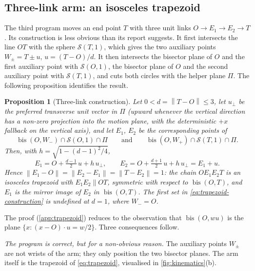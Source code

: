 \documentclass[11pt,a4paper]{article}
\theoremstyle{plain}
\newtheorem{proposition}{Proposition}
\theoremstyle{definition}
\theoremstyle{remark}
\newcommand{\norm}[1]{\left\lVert#1\right\rVert}
\newcommand{\bis}{\operatorname{bis}}
\newcommand{\Sph}{\mathcal{S}}
\begin{document}
\subsection{Three-link arm: an isosceles trapezoid}\label{sec:threelink}

The third program moves an end point $T$ with three unit links $O\to E_1\to
E_2\to T$. Its construction is less obvious than its report suggests. It first
intersects the line $OT$ with the sphere $\Sph(T,1)$, which gives the two
auxiliary points $W_\pm=T\pm u$, $u=(T-O)/d$. It then intersects the bisector
plane of $O$ and the first auxiliary point with $\Sph(O,1)$, the bisector plane
of $O$ and the second auxiliary point with $\Sph(T,1)$, and cuts both circles
with the helper plane $\Pi$. The following proposition identifies the result.

\begin{proposition}[Three-link construction]\label{prop:trapezoid}
Let $0<d=\norm{T-O}\le 3$, let $u_\perp$ be the preferred transverse unit
vector in $\Pi$ (upward whenever the vertical direction has a non-zero
projection into the motion plane, with the deterministic $+x$ fallback on the
vertical axis), and let $E_1$, $E_2$ be the corresponding points of
\begin{equation}
  \bis(O,W_-)\cap\Sph(O,1)\cap\Pi
  \qquad\text{and}\qquad
  \bis(O,W_+)\cap\Sph(T,1)\cap\Pi .
  \label{eq:trapezoid-construction}
\end{equation}
Then, with $h=\sqrt{1-(d-1)^2/4}$,
\begin{equation}
  E_1=O+\tfrac{d-1}{2}\,u+h\,u_\perp,
  \qquad
  E_2=O+\tfrac{d+1}{2}\,u+h\,u_\perp=E_1+u .
  \label{eq:trapezoid}
\end{equation}
Hence $\norm{E_1-O}=\norm{E_2-E_1}=\norm{T-E_2}=1$: the chain $OE_1E_2T$ is an
isosceles trapezoid with $E_1E_2\parallel OT$, symmetric with respect to
$\bis(O,T)$, and $E_1$ is the mirror image of $E_2$ in $\bis(O,T)$. The first
set in \cref{eq:trapezoid-construction} is undefined at $d=1$, where $W_-=O$.
\end{proposition}

The proof (\cref{app:trapezoid}) reduces to the observation that $\bis(O,wu)$
is the plane $\{x:(x-O)\cdot u=w/2\}$. Three consequences follow.

\emph{The program is correct, but for a non-obvious reason.} The auxiliary
points $W_\pm$ are not wrists of the arm; they only position the two bisector
planes. The arm itself is the trapezoid of \cref{eq:trapezoid}, visualised in
\cref{fig:kinematics}(b).
\end{document}

